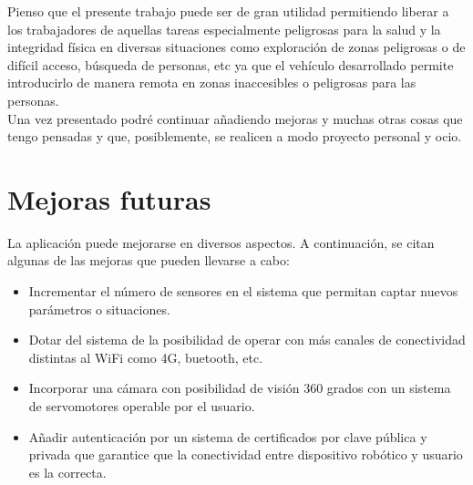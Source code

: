 Pienso que el presente trabajo puede ser de gran utilidad permitiendo liberar a los trabajadores de aquellas tareas especialmente peligrosas para la salud y la integridad física en diversas situaciones 
como exploración de zonas peligrosas o de difícil acceso, búsqueda de personas, etc ya que el vehículo desarrollado permite introducirlo de manera remota en zonas inaccesibles 
o peligrosas para las personas.\\

Una vez presentado podré continuar añadiendo mejoras y muchas otras cosas que tengo pensadas y que, posiblemente, se realicen a modo proyecto personal y ocio.\\

\section{Mejoras futuras}
\label{sec:mejoras_futuras}

La aplicación puede mejorarse en diversos aspectos. A continuación, se citan algunas de las mejoras que pueden llevarse a cabo:

\begin{itemize}
  \item Incrementar el número de sensores en el sistema que permitan captar nuevos parámetros o situaciones.
  \item Dotar del sistema de la posibilidad de operar con más canales de conectividad distintas al WiFi como 4G, buetooth, etc.
  \item Incorporar una cámara con posibilidad de visión 360 grados con un sistema de servomotores operable por el usuario.
  \item Añadir autenticación por un sistema de certificados por clave pública y privada que garantice que la conectividad entre dispositivo robótico y usuario es la correcta.
\end{itemize}

